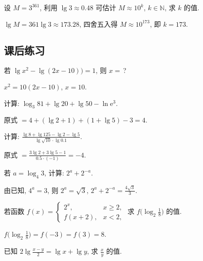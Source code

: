   \begin{exercise}
    设 $M=3^{361}$, 利用 $\lg3\approx0.48$ 可估计 $M\approx 10^k$, $k\in\mathbb{N}$, 求 $k$ 的值.
  \end{exercise}

  \beginsolution
    $\lg M= 361\lg3\approx 173.28$, 四舍五入得 $M\approx 10^{173}$, 即 $k=173$.
  \endsolution
  
  \subsection{课后练习}
  \begin{exercise}
    若 $\lg x^2-\lg(2x-10))=1$, 则 $x=$\,?
  \end{exercise}

  \beginsolution
    $x^2=10(2x-10)$, $x=10$.
  \endsolution
  
  \begin{exercise}
    计算: $\log_3 81+ \lg20+ \lg 50- \ln\mathrm{e}^3$.
  \end{exercise}

  \beginsolution
    原式 $= 4+(\lg2+1)+(1+\lg5)-3=4$.
  \endsolution
  
  \begin{exercise}
    计算: $\frac{\lg8+\lg125-\lg2-\lg5}{\lg\sqrt{10}\cdot\lg0.1}$.
  \end{exercise}

  \beginsolution
    原式 $=\frac{3\lg2+3\lg5-1}{0.5\cdot(-1)}=-4$.
  \endsolution

  \begin{exercise}
    若 $a=\log_4 3$, 计算: $2^a+2^{-a}$.
  \end{exercise}

  \beginsolution
    由已知, $4^a=3$, 则 $2^a=\sqrt3$, $2^a+2^{-a}=\frac{4\sqrt3}3$.
  \endsolution
  
  \begin{exercise}
    若函数 $f(x)=\begin{cases}
      2^x, & x\geqslant2,\\
      f(x+2), & x<2,
      \end{cases}$ 求 $f\Big(\log_2\frac18\Big)$ 的值.
  \end{exercise}

  \beginsolution
    $f\Big(\log_2\frac18\Big)= f(-3)= f(3)=8$.
  \endsolution
  
  \begin{exercise}
    已知 $2\lg\frac{x-y}2 =\lg x+\lg y$, 求 $\frac{x}{y}$ 的值.
  \end{exercise}

